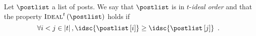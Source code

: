 \begin{definition}
  Let $\postlist$ a list of posts. We say that $\postlist$ is in
  $t$-\emph{ideal order} and that the property
  $\textsc{Ideal}^{t}\left(\postlist\right)$ holds if
  \begin{equation*}
    \forall i < j \in \left|t\right|,
    \idsc{\postlist\left[i\right]} \geq
    \idsc{\postlist\left[j\right]} \enspace.
  \end{equation*}
\end{definition}
